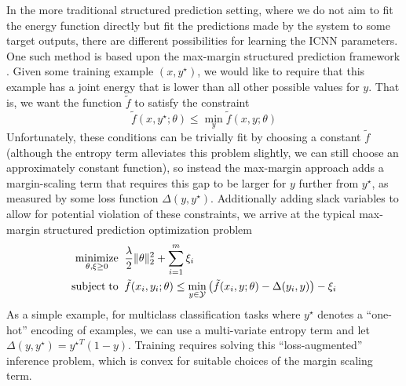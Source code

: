 In the more traditional structured prediction setting, where we do not aim to
fit the energy function directly but fit the predictions made by the system to
some target outputs, there are different possibilities for learning the ICNN
parameters.  One such method is based upon the max-margin structured
prediction framework \citep{tsochantaridis2005large,taskar2005learning}.  Given
some training example $(x, y^\star)$, we would like to require that this example
has a joint energy that is lower than all other possible values for $y$.  That
is, we want the function $\tilde{f}$ to satisfy the constraint
\begin{equation}
\tilde{f}(x, y^\star;\theta) \leq \min_y \tilde{f}(x,y;\theta)
\end{equation}
Unfortunately, these conditions can be trivially fit by choosing a constant
$\tilde{f}$ (although the entropy term alleviates this problem slightly, we can
still choose an approximately constant function), so instead the max-margin
approach adds a margin-scaling term that requires this gap to be larger for $y$
further from $y^\star$, as measured by some loss function $\Delta(y,y^\star)$.
Additionally adding slack variables to allow for potential violation of these
constraints, we arrive at the typical max-margin structured prediction
optimization problem
\begin{equation}
\begin{split}
\operatorname*{minimize}_{\theta,\xi \geq 0} \;\; & \frac{\lambda}{2}\|\theta\|_2^2 + \sum_
{i=1}^m
\xi_i \\
\operatorname*{subject\;to} \;\; &\tilde{f}(x_i,y_i;\theta) \leq \min_{y \in \mathcal{Y}} \left
(\tilde{f}(x_i,y;\theta) - \Delta(y_i,y) \right ) - \xi_i
\end{split}
\label{eq:structured-prediction}
\end{equation}
As a simple example, for multiclass classification tasks where $y^\star$ denotes
a ``one-hot'' encoding of examples, we can use a multi-variate entropy term and
let $\Delta (y,y^\star) = {y^\star}^T (1 - y)$. Training
requires solving this ``loss-augmented'' inference problem, which is convex
for suitable choices of the margin scaling term.

